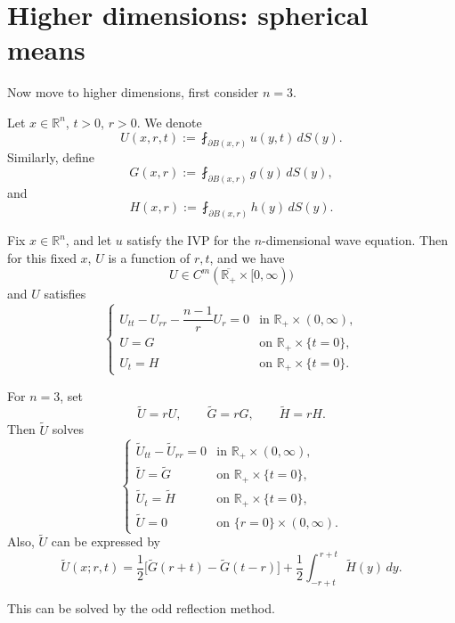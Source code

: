 \section{Higher dimensions: spherical means}

Now move to higher dimensions, first consider $n=3$.

\begin{definition}
Let $x\in \mathbb{R}^n$, $t>0$, $r>0$.
We denote
$$
U(x,r,t):=\fint_{\partial B(x,r)} u(y,t)\,dS(y).
$$
Similarly, define
$$
G(x,r):=\fint_{\partial B(x,r)} g(y)\,dS(y),
$$
and
$$
H(x,r):=\fint_{\partial B(x,r)} h(y)\,dS(y).
$$
\end{definition}

\begin{lemma}
Fix $x\in \mathbb{R}^n$, and let $u$ satisfy the IVP for the $n$-dimensional wave equation.
Then for this fixed $x$, $U$ is a function of $r,t$, and we have
$$
U\in C^m(\overline{\mathbb{R}_+}\times [0,\infty))
$$
and $U$ satisfies
$$
\begin{cases}
U_{tt}-U_{rr}-\dfrac{n-1}{r}U_r=0 & \text{in } \mathbb{R}_+\times (0,\infty),\\[1em]
U=G & \text{on } \mathbb{R}_+\times \{t=0\},\\
U_t=H & \text{on } \mathbb{R}_+\times \{t=0\}.
\end{cases}
$$
\end{lemma}

\begin{lemma}[Reduction when $n=3$]
For $n=3$, set
$$
\tilde{U}=rU, \qquad \tilde{G}=rG, \qquad \tilde{H}=rH.
$$
Then $\tilde{U}$ solves
$$
\begin{cases}
\tilde{U}_{tt}-\tilde{U}_{rr}=0 & \text{in } \mathbb{R}_+\times (0,\infty),\\
\tilde{U}=\tilde{G} & \text{on } \mathbb{R}_+\times \{t=0\},\\
\tilde{U}_t=\tilde{H} & \text{on } \mathbb{R}_+\times \{t=0\},\\
\tilde{U}=0 & \text{on } \{r=0\}\times (0,\infty).
\end{cases}
$$
Also, $\tilde{U}$ can be expressed by
$$
\tilde{U}(x;r,t)
=
\frac12\bigl[\tilde{G}(r+t)-\tilde{G}(t-r)\bigr]
+
\frac12\int_{-r+t}^{\,r+t}\tilde{H}(y)\,dy.
$$
\end{lemma}

\begin{remark}
This can be solved by the odd reflection method.
\end{remark}


